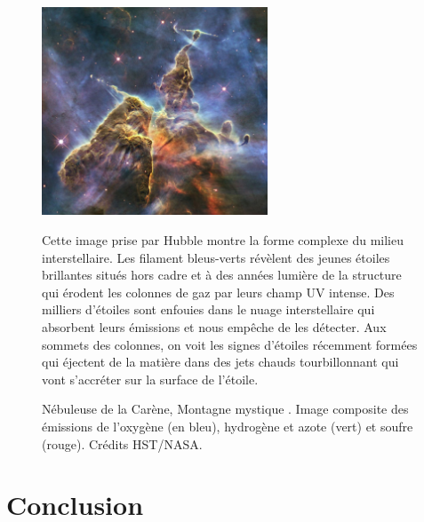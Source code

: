 \documentclass[11pt,a4paper]{article}
\begin{document}
\begin{spacing}{0.98}
\begin{figure}[!p]
    \centering
    \includegraphics[width = 0.6\textwidth]{figure/mystic.pdf}
    \caption{Nébuleuse de la Carène, \og Montagne mystique \fg{}. Image composite des émissions de l’oxygène (en bleu), hydrogène et azote (vert) et soufre (rouge). Crédits HST/NASA.}
    \vspace{1em}
    \begin{minipage}{\textwidth}
    Cette image prise par Hubble montre la forme complexe du milieu interstellaire. Les filament bleus-verts révèlent des jeunes étoiles brillantes situés hors cadre et à des années lumière de la structure qui érodent les colonnes de gaz par leurs champ UV intense. Des milliers d'étoiles sont enfouies dans le nuage interstellaire qui absorbent leurs émissions et nous empêche de les détecter. Aux sommets des colonnes, on voit les signes d'étoiles récemment formées qui éjectent de la matière dans des jets chauds tourbillonnant qui vont s'accréter sur la surface de l'étoile.
    \end{minipage}
    \label{fig:intro:mystic}
\end{figure}






\clearpage



\section*{Conclusion}

\clearpage



\clearpage





\end{spacing}
\end{document}

